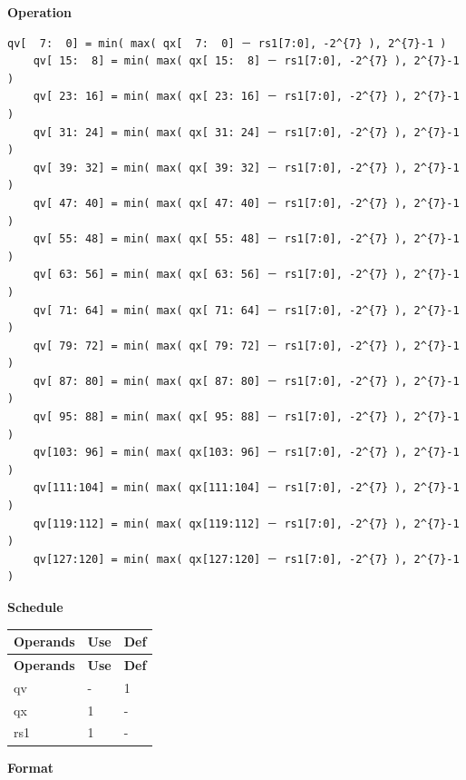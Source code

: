 \textbf{Operation}\\
\begin{lstlisting}[escapeinside=`?]
    qv[  7:  0] = min( max( qx[  7:  0] － rs1[7:0], -2^{7} ), 2^{7}-1 )
    qv[ 15:  8] = min( max( qx[ 15:  8] － rs1[7:0], -2^{7} ), 2^{7}-1 )
    qv[ 23: 16] = min( max( qx[ 23: 16] － rs1[7:0], -2^{7} ), 2^{7}-1 )
    qv[ 31: 24] = min( max( qx[ 31: 24] － rs1[7:0], -2^{7} ), 2^{7}-1 )
    qv[ 39: 32] = min( max( qx[ 39: 32] － rs1[7:0], -2^{7} ), 2^{7}-1 )
    qv[ 47: 40] = min( max( qx[ 47: 40] － rs1[7:0], -2^{7} ), 2^{7}-1 )
    qv[ 55: 48] = min( max( qx[ 55: 48] － rs1[7:0], -2^{7} ), 2^{7}-1 )
    qv[ 63: 56] = min( max( qx[ 63: 56] － rs1[7:0], -2^{7} ), 2^{7}-1 )
    qv[ 71: 64] = min( max( qx[ 71: 64] － rs1[7:0], -2^{7} ), 2^{7}-1 )
    qv[ 79: 72] = min( max( qx[ 79: 72] － rs1[7:0], -2^{7} ), 2^{7}-1 )
    qv[ 87: 80] = min( max( qx[ 87: 80] － rs1[7:0], -2^{7} ), 2^{7}-1 )
    qv[ 95: 88] = min( max( qx[ 95: 88] － rs1[7:0], -2^{7} ), 2^{7}-1 )
    qv[103: 96] = min( max( qx[103: 96] － rs1[7:0], -2^{7} ), 2^{7}-1 )
    qv[111:104] = min( max( qx[111:104] － rs1[7:0], -2^{7} ), 2^{7}-1 )
    qv[119:112] = min( max( qx[119:112] － rs1[7:0], -2^{7} ), 2^{7}-1 )
    qv[127:120] = min( max( qx[127:120] － rs1[7:0], -2^{7} ), 2^{7}-1 )
\end{lstlisting}


\textbf{Schedule}\\
\begin{longtable}[c]{|l|l|l|}
    \hline
    \rowcolor{lightgray}
    \textbf{Operands} & \textbf{Use} & \textbf{Def} \\\hline
    \endfirsthead
    \hline
    \rowcolor{lightgray}
     \textbf{Operands} & \textbf{Use} & \textbf{Def} \\\hline
    \endhead
    \hline
    \endfoot

  qv & - & 1 \\\hline
    qx & 1 & - \\\hline
    rs1 & 1 & -

\end{longtable}

\textbf{Format}\\

